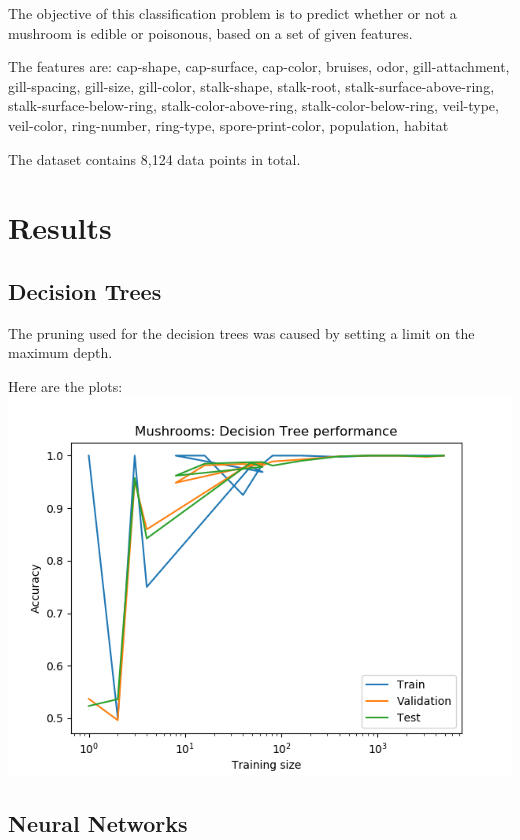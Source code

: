\documentclass[11pt]{article}
\begin{document}
            The objective of this classification problem is to predict
            whether or not a mushroom is edible or poisonous, based on a set
            of given features.

            The features are: cap-shape, cap-surface, cap-color, bruises, odor, gill-attachment, gill-spacing, gill-size, gill-color, stalk-shape, stalk-root, stalk-surface-above-ring, stalk-surface-below-ring, stalk-color-above-ring, stalk-color-below-ring, veil-type, veil-color, ring-number, ring-type, spore-print-color, population, habitat

            The dataset contains 8,124 data points in total.


        
        \section{Results}

        \subsection{Decision Trees}
        The pruning used for the decision trees was caused by setting a limit on the maximum depth.

        Here are the plots:
        \includegraphics{mushrooms/mushroom_dt_trainingsize.png}

        \subsection{Neural Networks}
\end{document}
